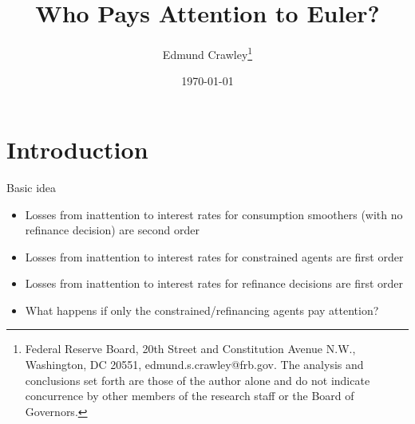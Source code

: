 \documentclass[AER]{AEA}
\begin{document}
\title{Who Pays Attention to Euler?}
\author{Edmund Crawley\thanks{ Federal Reserve Board, 20th Street and Constitution Avenue N.W., Washington, DC 20551, edmund.s.crawley@frb.gov. The analysis and conclusions set forth are those of the author alone and do not indicate concurrence by other members of the research staff or the Board of Governors.}}
\date{\today}
\pubMonth{}
\pubYear{}
\pubVolume{}
\pubIssue{}
\JEL{}

\begin{abstract}

\end{abstract}


\maketitle

\newpage
\section{Introduction}
Basic idea
\begin{itemize}
\item Losses from inattention to interest rates for consumption smoothers (with no refinance decision) are second order
\item Losses from inattention to interest rates for constrained agents are first order
\item Losses from inattention to interest rates for refinance decisions are first order
\item What happens if only the constrained/refinancing agents pay attention?
\end{itemize}
\end{document}
